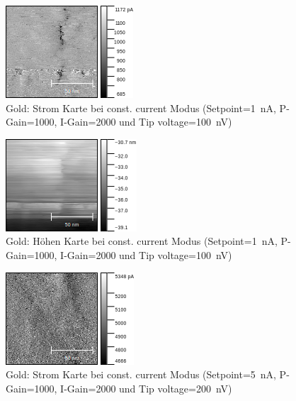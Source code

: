 \documentclass[sn-mathphys-num,iicol]{sn-jnl}
\theoremstyle{thmstyleone}
\theoremstyle{thmstyletwo}
\theoremstyle{thmstylethree}
\begin{document}
\begin{figure}[t]
        \centering
        \includegraphics[width=.5\textwidth]{../data/Graphit2_current.png}
        \caption{Gold: Strom Karte bei const. current Modus (Setpoint=\SI{1}{\nano A}, P-Gain=\SI{1000}{}, I-Gain=\SI{2000}{} und Tip voltage=\SI{100}{\nano V})} \label{fig:gr2c}
\end{figure}
\begin{figure}[t]
        \centering
        \includegraphics[width=.5\textwidth]{../data/Graphit2_z.png}
        \caption{Gold: Höhen Karte bei const. current Modus (Setpoint=\SI{1}{\nano A}, P-Gain=\SI{1000}{}, I-Gain=\SI{2000}{} und Tip voltage=\SI{100}{\nano V})} \label{fig:gr2z}
\end{figure}
\begin{figure}[t]
        \centering
        \includegraphics[width=.5\textwidth]{../data/Graphit3_current.png}
        \caption{Gold: Strom Karte bei const. current Modus (Setpoint=\SI{5}{\nano A}, P-Gain=\SI{1000}{}, I-Gain=\SI{2000}{} und Tip voltage=\SI{200}{\nano V})} \label{fig:gr3c}
\end{figure}
\end{document}
